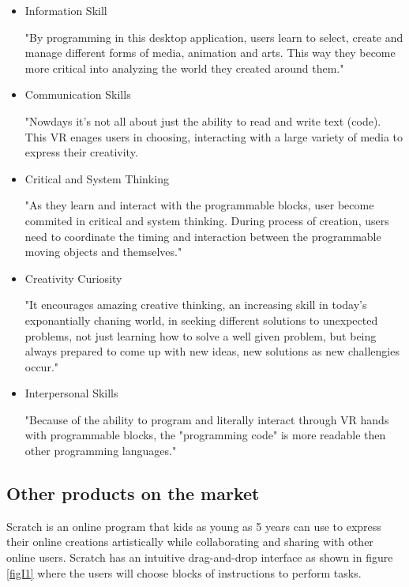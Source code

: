 \begin{itemize}
\item{Information Skill}

"By programming in this desktop application, users learn to select, create and manage different forms of media, animation and arts. This way they become more critical into analyzing the world they created around them."
\item{Communication Skills}

"Nowdays it's not all about just the ability to read and write text (code). This VR enages users in choosing, interacting with a large variety of media to express their creativity.
 
\item{Critical and System Thinking}

"As they learn and interact with the programmable blocks, user become commited in critical and system thinking. During process of creation, users need to coordinate the timing and interaction between the programmable moving objects and themselves."

\item{Creativity Curiosity}

"It encourages amazing creative thinking, an  increasing skill in today's exponantially chaning world, in seeking different solutions to unexpected problems, not just learning how to solve a well given problem, but being always prepared to come up with new ideas, new solutions as new challengies occur."

\item{Interpersonal Skills}

"Because of the ability to program and literally interact through VR hands with programmable blocks, the "programming code" is more readable then other programming languages."

\end{itemize}

\subsection{Other products on the market}

Scratch \cite{sk} is an online program that kids as young as 5 years can use to express their online creations artistically while collaborating and sharing with other online users. Scratch has an intuitive drag-and-drop interface as shown in figure \ref{figI1} where the users will choose blocks of instructions to perform tasks.

